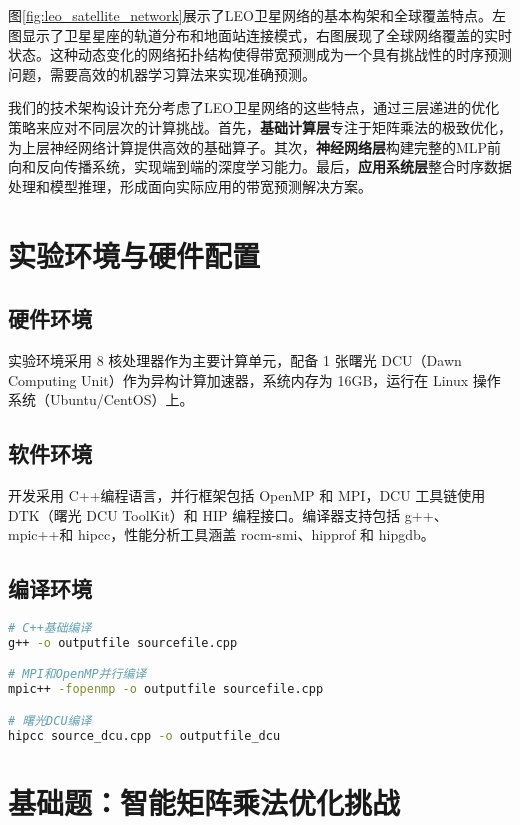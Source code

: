\documentclass[a4paper]{article}
\begin{document}
图\ref{fig:leo_satellite_network}展示了LEO卫星网络的基本构架和全球覆盖特点。左图显示了卫星星座的轨道分布和地面站连接模式，右图展现了全球网络覆盖的实时状态。这种动态变化的网络拓扑结构使得带宽预测成为一个具有挑战性的时序预测问题，需要高效的机器学习算法来实现准确预测。

我们的技术架构设计充分考虑了LEO卫星网络的这些特点，通过三层递进的优化策略来应对不同层次的计算挑战。首先，\textbf{基础计算层}专注于矩阵乘法的极致优化，为上层神经网络计算提供高效的基础算子。其次，\textbf{神经网络层}构建完整的MLP前向和反向传播系统，实现端到端的深度学习能力。最后，\textbf{应用系统层}整合时序数据处理和模型推理，形成面向实际应用的带宽预测解决方案。

\section{实验环境与硬件配置}

\subsection{硬件环境}

实验环境采用 8 核处理器作为主要计算单元，配备 1 张曙光 DCU（Dawn Computing Unit）作为异构计算加速器，系统内存为 16GB，运行在 Linux 操作系统（Ubuntu/CentOS）上。

\subsection{软件环境}

开发采用 C++编程语言，并行框架包括 OpenMP 和 MPI，DCU 工具链使用 DTK（曙光 DCU ToolKit）和 HIP 编程接口。编译器支持包括 g++、mpic++和 hipcc，性能分析工具涵盖 rocm-smi、hipprof 和 hipgdb。

\subsection{编译环境}

\begin{lstlisting}[language=bash]
# C++基础编译
g++ -o outputfile sourcefile.cpp

# MPI和OpenMP并行编译
mpic++ -fopenmp -o outputfile sourcefile.cpp

# 曙光DCU编译
hipcc source_dcu.cpp -o outputfile_dcu
\end{lstlisting}

\section{基础题：智能矩阵乘法优化挑战}
\end{document}

